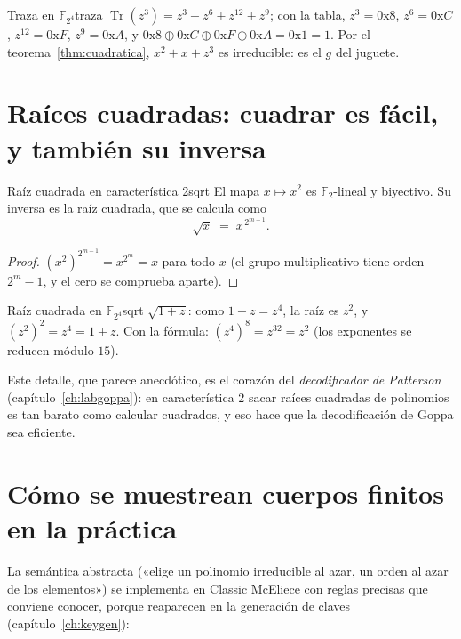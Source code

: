 \documentclass[11pt,a4paper,oneside]{report}
\newcommand{\F}{\mathbb{F}}
\newcommand{\FF}[1]{\F_{2^{#1}}}
\DeclareMathOperator{\Tr}{Tr}
\begin{document}
\begin{ejemplo}{Traza en $\FF4$}{traza}
$\Tr(z^3)=z^3+z^6+z^{12}+z^{9}$; con la tabla,
$z^3{=}0\text{x}8$, $z^6{=}0\text{x}C$, $z^{12}{=}0\text{x}F$,
$z^9{=}0\text{x}A$, y $0\text{x}8\oplus 0\text{x}C\oplus 0\text{x}F\oplus
0\text{x}A=0\text{x}1=1$. Por el teorema~\ref{thm:cuadratica}, $x^2+x+z^3$
es irreducible: es el $g$ del juguete.
\end{ejemplo}

\section{Raíces cuadradas: cuadrar es fácil, y también su inversa}

\begin{proposicion}{Raíz cuadrada en característica 2}{sqrt}
El mapa $x\mapsto x^2$ es $\F_2$-lineal y biyectivo. Su inversa es la raíz
cuadrada, que se calcula como
\[
\sqrt{x}\;=\;x^{\,2^{m-1}} .
\]
\end{proposicion}
\begin{proof}
$(x^2)^{2^{m-1}}=x^{2^m}=x$ para todo $x$ (el grupo multiplicativo tiene
orden $2^m-1$, y el cero se comprueba aparte).
\end{proof}

\begin{ejemplo}{Raíz cuadrada en $\FF4$}{sqrt}
$\sqrt{1+z}$: como $1+z=z^4$, la raíz es $z^2$, y
$(z^2)^2=z^4=1+z$. Con la fórmula: $(z^4)^{8}=z^{32}=z^2$ (los exponentes
se reducen módulo $15$).
\end{ejemplo}

Este detalle, que parece anecdótico, es el corazón del \emph{decodificador
de Patterson} (capítulo~\ref{ch:labgoppa}): en característica 2 sacar
raíces cuadradas de polinomios es tan barato como calcular cuadrados, y eso
hace que la decodificación de Goppa sea eficiente.

\section{Cómo se muestrean cuerpos finitos en la práctica}

La semántica abstracta («elige un polinomio irreducible al azar, un orden
al azar de los elementos») se implementa en Classic McEliece con reglas
precisas que conviene conocer, porque reaparecen en la generación de claves
(capítulo~\ref{ch:keygen}):
\end{document}
